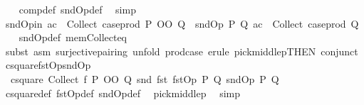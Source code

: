 \begin{isabellebody}
%
\isadelimproof
\ \ %
\endisadelimproof
%
\isatagproof
{}\isamarkupfalse%
\ comp{\isacharunderscore}{\kern0pt}def\ sndOp{\isacharunderscore}{\kern0pt}def\ \isamarkupfalse%
\ simp%
\endisatagproof
{\isafoldproof}%
%
\isadelimproof
\isanewline
%
\endisadelimproof
\isanewline
{}\isamarkupfalse%
\ sndOp{\isacharunderscore}{\kern0pt}in{\isacharcolon}{\kern0pt}\ {\isachardoublequoteopen}ac\ {\isasymin}\ Collect\ {\isacharparenleft}{\kern0pt}case{\isacharunderscore}{\kern0pt}prod\ {\isacharparenleft}{\kern0pt}P\ OO\ Q{\isacharparenright}{\kern0pt}{\isacharparenright}{\kern0pt}\ {\isasymLongrightarrow}\ sndOp\ P\ Q\ ac\ {\isasymin}\ Collect\ {\isacharparenleft}{\kern0pt}case{\isacharunderscore}{\kern0pt}prod\ Q{\isacharparenright}{\kern0pt}{\isachardoublequoteclose}\isanewline
%
\isadelimproof
\ \ %
\endisadelimproof
%
\isatagproof
{}\isamarkupfalse%
\ sndOp{\isacharunderscore}{\kern0pt}def\ mem{\isacharunderscore}{\kern0pt}Collect{\isacharunderscore}{\kern0pt}eq\isanewline
\ \ \isamarkupfalse%
\ {\isacharparenleft}{\kern0pt}subst\ {\isacharparenleft}{\kern0pt}asm{\isacharparenright}{\kern0pt}\ surjective{\isacharunderscore}{\kern0pt}pairing{\isacharcomma}{\kern0pt}\ unfold\ prod{\isachardot}{\kern0pt}case{\isacharparenright}{\kern0pt}\ {\isacharparenleft}{\kern0pt}erule\ pick{\isacharunderscore}{\kern0pt}middlep{\isacharbrackleft}{\kern0pt}THEN\ conjunct{}{\isacharbrackright}{\kern0pt}{\isacharparenright}{\kern0pt}%
\endisatagproof
{\isafoldproof}%
%
\isadelimproof
\isanewline
%
\endisadelimproof
\isanewline
{}\isamarkupfalse%
\ csquare{\isacharunderscore}{\kern0pt}fstOp{\isacharunderscore}{\kern0pt}sndOp{\isacharcolon}{\kern0pt}\isanewline
\ \ {\isachardoublequoteopen}csquare\ {\isacharparenleft}{\kern0pt}Collect\ {\isacharparenleft}{\kern0pt}f\ {\isacharparenleft}{\kern0pt}P\ OO\ Q{\isacharparenright}{\kern0pt}{\isacharparenright}{\kern0pt}{\isacharparenright}{\kern0pt}\ snd\ fst\ {\isacharparenleft}{\kern0pt}fstOp\ P\ Q{\isacharparenright}{\kern0pt}\ {\isacharparenleft}{\kern0pt}sndOp\ P\ Q{\isacharparenright}{\kern0pt}{\isachardoublequoteclose}\isanewline
%
\isadelimproof
\ \ %
\endisadelimproof
%
\isatagproof
{}\isamarkupfalse%
\ csquare{\isacharunderscore}{\kern0pt}def\ fstOp{\isacharunderscore}{\kern0pt}def\ sndOp{\isacharunderscore}{\kern0pt}def\ \isamarkupfalse%
\ pick{\isacharunderscore}{\kern0pt}middlep\ \isamarkupfalse%
\ simp%
\endisatagproof
{\isafoldproof}%
%
\isadelimproof
\isanewline

\end{isabellebody}
